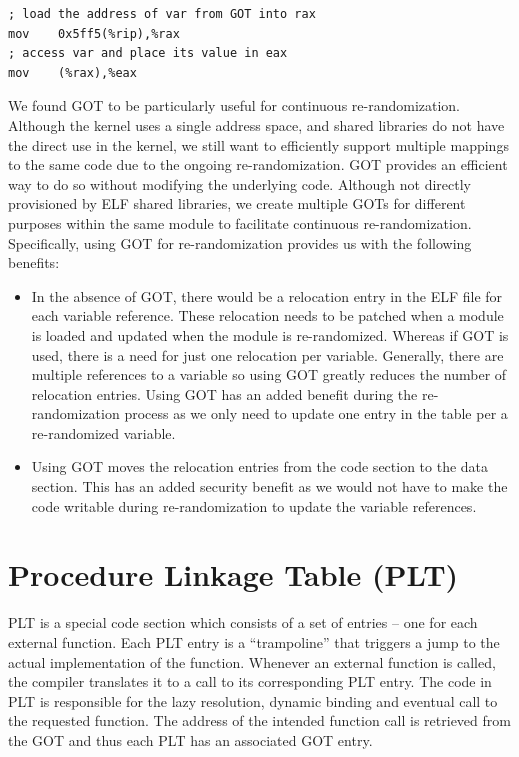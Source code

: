 \lstset{language=[x64]Assembler}
\begin{lstlisting}[frame=single, caption={Assembly Code, accessing a global variable through GOT}]
; load the address of var from GOT into rax
mov    0x5ff5(%rip),%rax
; access var and place its value in eax
mov    (%rax),%eax
\end{lstlisting}

We found GOT to be particularly useful for continuous re\hyp{}randomization.
Although the kernel uses a single address space, and shared libraries do not have the direct use in the kernel, we still want to efficiently support multiple mappings to the same code due to the ongoing re\hyp{}randomization.
GOT provides an efficient way to do so without modifying the underlying code. Although not directly provisioned by ELF shared libraries, we create multiple GOTs for different purposes within the same module to facilitate continuous re\hyp{}randomization. Specifically, using GOT for re-randomization provides us with the following benefits:

\begin{itemize}
    \item In the absence of GOT, there would be a relocation entry in the ELF file for each variable reference. These relocation needs to be patched when a module is loaded and updated when the module is re-randomized. Whereas if GOT is used, there is a need for just one relocation per variable. Generally, there are multiple references to a variable so using GOT greatly reduces the number of relocation entries. Using GOT has an added benefit during the re-randomization process as we only need to update one entry in the table per a re-randomized variable.
    \item Using GOT moves the relocation entries from the code section to the data section. This has an added security benefit as we would not have to make the code writable during re-randomization to update the variable references.
\end{itemize}

\section{Procedure Linkage Table (PLT)} \label{sec:background_plt}
PLT is a special code section which consists of a set of entries -- one for each external function. Each PLT entry is a ``trampoline'' that triggers a jump to the actual implementation of the function. Whenever an external function is called, the compiler translates it to a call to its corresponding PLT entry. The code in PLT is responsible for the lazy resolution, dynamic binding and eventual call to the requested function. The address of the intended function call is retrieved from the GOT and thus each PLT has an associated GOT entry.

